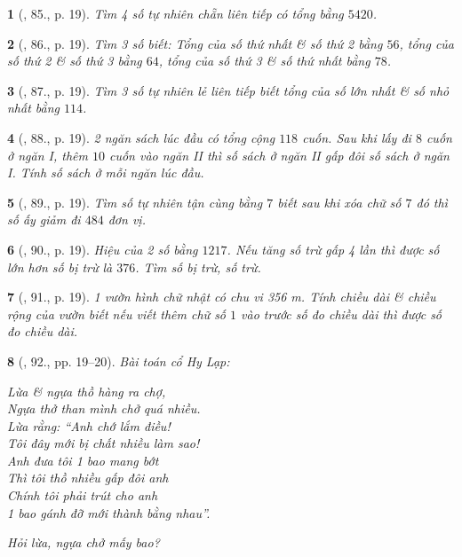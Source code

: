 \documentclass{article}
\newtheorem{baitoan}{}
\begin{document}
\begin{baitoan}[\cite{Binh_Toan_6_tap_1}, 85., p. 19]
	Tìm 4 số tự nhiên chẵn liên tiếp có tổng bằng $5420$.
\end{baitoan}

\begin{baitoan}[\cite{Binh_Toan_6_tap_1}, 86., p. 19]
	Tìm 3 số biết: Tổng của số thứ nhất \& số thứ 2 bằng $56$, tổng của số thứ 2 \& số thứ 3 bằng $64$, tổng của số thứ 3 \& số thứ nhất bằng $78$.
\end{baitoan}

\begin{baitoan}[\cite{Binh_Toan_6_tap_1}, 87., p. 19]
	Tìm 3 số tự nhiên lẻ liên tiếp biết tổng của số lớn nhất \& số nhỏ nhất bằng $114$.
\end{baitoan}

\begin{baitoan}[\cite{Binh_Toan_6_tap_1}, 88., p. 19]
	2 ngăn sách lúc đầu có tổng cộng $118$ cuốn. Sau khi lấy đi $8$ cuốn ở ngăn {\rm I}, thêm $10$ cuốn vào ngăn {\rm II} thì số sách ở ngăn {\rm II} gấp đôi số sách ở ngăn {\rm I}. Tính số sách ở mỗi ngăn lúc đầu.
\end{baitoan}

\begin{baitoan}[\cite{Binh_Toan_6_tap_1}, 89., p. 19]
	Tìm số tự nhiên tận cùng bằng $7$ biết sau khi xóa chữ số $7$ đó thì số ấy giảm đi $484$ đơn vị.
\end{baitoan}

\begin{baitoan}[\cite{Binh_Toan_6_tap_1}, 90., p. 19]
	Hiệu của 2 số bằng $1217$. Nếu tăng số trừ gấp 4 lần thì được số lớn hơn số bị trừ là $376$. Tìm số bị trừ, số trừ.
\end{baitoan}

\begin{baitoan}[\cite{Binh_Toan_6_tap_1}, 91., p. 19]
	1 vườn hình chữ nhật có chu vi {\rm356 m}. Tính chiều dài \& chiều rộng của vườn biết nếu viết thêm chữ số $1$ vào trước số đo chiều dài thì được số đo chiều dài.
\end{baitoan}

\begin{baitoan}[\cite{Binh_Toan_6_tap_1}, 92., pp. 19--20]
	Bài toán cổ Hy Lạp:
	\begin{center}
		Lừa \& ngựa thồ hàng ra chợ,\\Ngựa thở than mình chở quá nhiều.\\Lừa rằng: ``Anh chớ lắm điều!\\Tôi đây mới bị chất nhiều làm sao!\\Anh đưa tôi 1 bao mang bớt\\Thì tôi thồ nhiều gấp đôi anh\\Chính tôi phải trút cho anh\\1 bao gánh đỡ mới thành bằng nhau''.
	\end{center}
	Hỏi lừa, ngựa chở mấy bao?
\end{baitoan}
\end{document}
